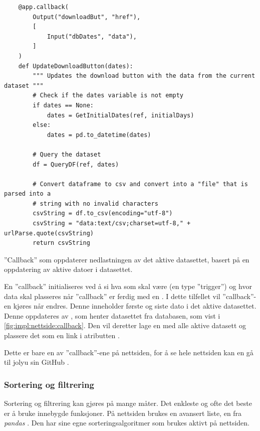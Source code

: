 \begin{listing}[!htb]
\begin{verbatim}
    @app.callback(
        Output("downloadBut", "href"),
        [
            Input("dbDates", "data"),
        ]
    )
    def UpdateDownloadButton(dates):
        """ Updates the download button with the data from the current dataset """
        # Check if the dates variable is not empty
        if dates == None:
            dates = GetInitialDates(ref, initialDays)
        else:
            dates = pd.to_datetime(dates)
        
        # Query the dataset
        df = QueryDF(ref, dates)
    
        # Convert dataframe to csv and convert into a "file" that is parsed into a 
        # string with no invalid characters
        csvString = df.to_csv(encoding="utf-8")
        csvString = "data:text/csv;charset=utf-8," + urlParse.quote(csvString)
        return csvString
\end{verbatim}
\caption{''Callback'' som oppdaterer nedlastningen av det aktive datasettet, basert på en oppdatering av aktive datoer i datasettet.}
\label{code:impl:nettside:callback}
\end{listing}

En ''callback'' initialiseres ved å si hva som skal være  (en type ''trigger'') og hvor data skal plasseres når ''callback'' er ferdig med en . 
I dette tilfellet vil ''callback''-en kjøres når  endres. 
Denne inneholder første og siste dato i det aktive datasettet. 
Denne oppdateres av , som henter datasettet fra databasen, som vist i \autoref{fig:impl:nettside:callback}. 
Den vil deretter lage en  med alle aktive datasett og plassere det som en link i atributten .

Dette er bare en av ''callback''-ene på nettsiden, for å se hele nettsiden kan en gå til jolyu sin GitHub \cite{GitHub}.

\subsubsection{Sortering og filtrering}\label{sec:impl:nettside:sortering}

Sortering og filtrering kan gjøres på mange måter. 
Det enkleste og ofte det beste er å bruke innebygde funksjoner. 
På nettsiden brukes en avansert liste, en  fra \textit{pandas} \cite{dataframe}. 
Den har sine egne sorteringsalgoritmer som brukes aktivt på nettsiden. 

